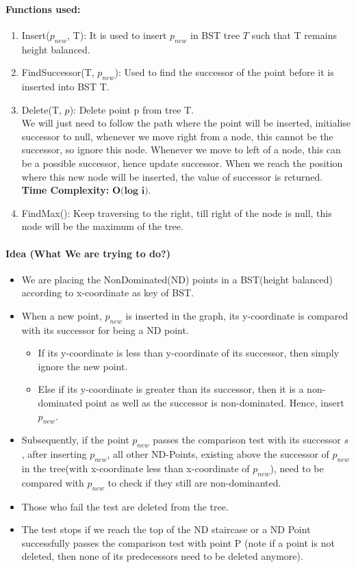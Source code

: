 \documentclass[pdftex,a4paper,12pt]{report}
\begin{document}
\paragraph{Functions used:} 
\begin{enumerate}
 \item
 Insert($p_{new}$, T): It is used to insert $p_{new}$ in BST tree $T$ such that T remains height balanced.
 \item 
  FindSuccessor(T, $p_{new}$): Used to find the successor of the point before it is inserted into BST T.
  \item
 Delete(T, $p$): Delete point p from tree T.\\
\makebox[40pt]{}We will just need to follow the path where the point will be inserted, initialise successor to null, 
whenever we move right from a node, this cannot be the successor,
so ignore this node. Whenever we move to left of a node, this can be a possible successor, hence update successor. When we reach the
position where this new node will be inserted, the value of successor is returned. \\
\textbf{Time Complexity:} $\textbf{O(log i)}$.
\item
FindMax(): Keep traversing to the right, till right of the node is null, this node will be the maximum of the tree.
\end{enumerate}
\paragraph{Idea (What We are trying to do?)} \makebox[2pt]{}
\begin{itemize}
 \item We are placing the NonDominated(ND) points in a BST(height balanced) according to x-coordinate as key of BST.
 \item When a new point, $p_{new}$ is inserted in the graph, its y-coordinate is compared with its successor for being a ND point.
    \begin{itemize}
    \item If its y-coordinate is less than y-coordinate of its successor, then simply ignore the new point. 
    \item Else if its y-coordinate is greater than its successor, then it is a non-dominated point as well as the successor is non-dominated. Hence, 
    insert $p_{new}$.
    \end{itemize}
 \item Subsequently, if the point $p_{new}$ passes the comparison test with its successor $s$, after inserting $p_{new}$, all other ND-Points,
 existing above the successor of $p_{new}$ in the tree(with x-coordinate less than x-coordinate of $p_{new}$),
 need to be compared with $p_{new}$ to check if they still are non-dominanted.
 \item Those who fail the test are deleted from the tree.
 \item The test stops if we reach the top of the ND staircase or a ND Point successfully passes the comparison test with point P
 (note if a point is not deleted, then none of its predecessors need to be deleted anymore).
\end{itemize}
\end{document}
